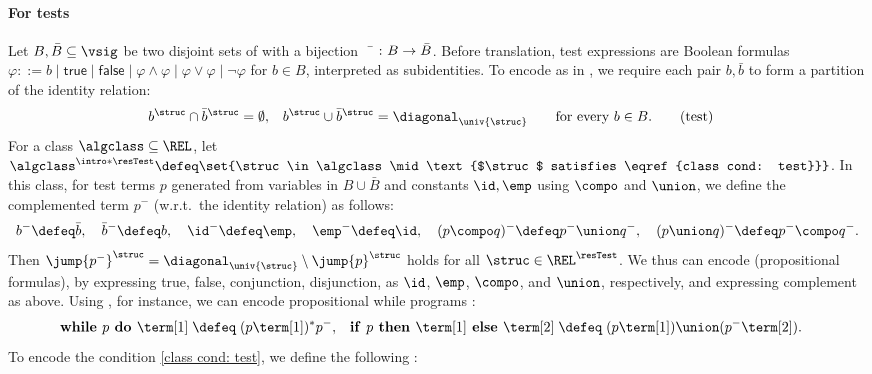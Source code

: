 \paragraph*{For tests}
Let $B, \bar{B} \subseteq \vsig$ be two disjoint sets of 
with a bijection $\bar{\mbox{\quad}} \colon B \to \bar{B}$.
Before translation, test expressions are Boolean formulas
$\varphi ::= b \mid \mathsf{true} \mid \mathsf{false} \mid
\varphi\land\varphi \mid \varphi\lor\varphi \mid \lnot\varphi$ for $b\in B$,
interpreted as subidentities.
To encode \intro*{} as in  \cite{kozenKleeneAlgebraTests1996},
we require each pair $b,\bar b$ to form a partition of the identity relation:
\begin{align*}
b^{\struc} \cap \bar b^{\struc} &= \emptyset,
& b^{\struc} \cup \bar b^{\struc} &= \diagonal_{\univ{\struc}}
\qquad\text{for every $b \in B$.} \tag{test}\label{class cond: test}
\end{align*}
\AP
For a class $\algclass \subseteq \REL$,
let $\algclass^{\intro*\resTest} \defeq \set{\struc \in \algclass \mid \text{$\struc$ satisfies \eqref{class cond: test}}}$.
In this class, for test terms $p$ generated from variables in $B \cup \bar{B}$ and constants $\id,\emp$ using $\compo$ and $\union$,
we define the complemented term $p^{-}$ (w.r.t.\  the identity relation) as follows:
\begin{gather*}
    b^{-} \defeq \bar{b}, \quad
    \bar{b}^{-} \defeq b, \quad
    \id^{-} \defeq \emp, \quad
    \emp^{-} \defeq \id, \quad
    (p \compo q)^{-} \defeq p^{-} \union q^{-}, \quad
    (p \union q)^{-} \defeq p^{-} \compo q^{-}.
\end{gather*}
Then $\jump{p^{-}}^{\struc} = \diagonal_{\univ{\struc}} \setminus \jump{p}^{\struc}$ holds for all $\struc \in \REL^{\resTest}$.
We thus can encode  (propositional formulas),
by expressing true, false, conjunction, disjunction,
as $\id$, $\emp$, $\compo$, and $\union$,
respectively,
and expressing complement as above.
Using , for instance, we can encode propositional while programs \cite{fischerPropositionalDynamicLogic1979,kozenKleeneAlgebraTests1997}:
\begin{align*}
    \mbox{\textbf{while }} p \mbox{\textbf{ do }} \term[1] &\;\defeq\; (p \term[1])^{*} p^{-}, &
    \mbox{\textbf{if }} p \mbox{\textbf{ then }} \term[1] \mbox{\textbf{ else }} \term[2] &\;\defeq\; (p \term[1]) \union (p^{-} \term[2]).
\end{align*}
To encode the condition \eqref{class cond: test}, we define the following :
